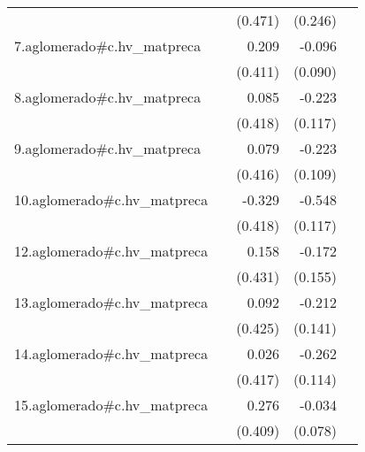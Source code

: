 {\begin{longtable}{l*{4}{D{.}{.}{-1}}}
            &                     &     (0.471)         &     (0.246)         &                     \\
\addlinespace
7.aglomerado#c.hv\_matpreca&                     &       0.209         &      -0.096         &                     \\
            &                     &     (0.411)         &     (0.090)         &                     \\
\addlinespace
8.aglomerado#c.hv\_matpreca&                     &       0.085         &      -0.223         &                     \\
            &                     &     (0.418)         &     (0.117)         &                     \\
\addlinespace
9.aglomerado#c.hv\_matpreca&                     &       0.079         &      -0.223\sym{*}  &                     \\
            &                     &     (0.416)         &     (0.109)         &                     \\
\addlinespace
10.aglomerado#c.hv\_matpreca&                     &      -0.329         &      -0.548\sym{***}&                     \\
            &                     &     (0.418)         &     (0.117)         &                     \\
\addlinespace
12.aglomerado#c.hv\_matpreca&                     &       0.158         &      -0.172         &                     \\
            &                     &     (0.431)         &     (0.155)         &                     \\
\addlinespace
13.aglomerado#c.hv\_matpreca&                     &       0.092         &      -0.212         &                     \\
            &                     &     (0.425)         &     (0.141)         &                     \\
\addlinespace
14.aglomerado#c.hv\_matpreca&                     &       0.026         &      -0.262\sym{*}  &                     \\
            &                     &     (0.417)         &     (0.114)         &                     \\
\addlinespace
15.aglomerado#c.hv\_matpreca&                     &       0.276         &      -0.034         &                     \\
            &                     &     (0.409)         &     (0.078)         &                     \\

\end{longtable}}
